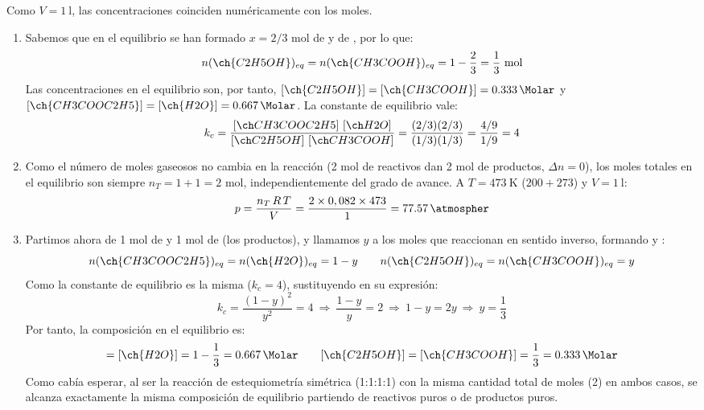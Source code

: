 \begin{exerciseEVAU}
\begin{solu}
        Como \(V = \SI{1}{\litre}\), las concentraciones coinciden numéricamente con los moles.

        \begin{enumerate}[label=\letraminuscula]
\item Sabemos que en el equilibrio se han formado \(x = 2/3\) mol de  y de , por lo que:
\begin{equation*}
    n(\ch{C2H5OH})_{eq} = n(\ch{CH3COOH})_{eq} = 1 - \dfrac{2}{3} = \dfrac{1}{3} \ \text{mol}
\end{equation*}
Las concentraciones en el equilibrio son, por tanto, \([\ch{C2H5OH}] = [\ch{CH3COOH}] = \SI{0.333}{\Molar}\) y \([\ch{CH3COOC2H5}] = [\ch{H2O}] = \SI{0.667}{\Molar}\). La constante de equilibrio vale:
\begin{equation*}
    k_c = \dfrac{\conc{CH3COOC2H5}\ \conc{H2O}}{\conc{C2H5OH}\ \conc{CH3COOH}} = \dfrac{(2/3)(2/3)}{(1/3)(1/3)} = \dfrac{4/9}{1/9} = 4
\end{equation*}
\item Como el número de moles gaseosos no cambia en la reacción (2 mol de reactivos dan 2 mol de productos, \(\Delta n = 0\)), los moles totales en el equilibrio son siempre \(n_T = 1+1 = 2\) mol, independientemente del grado de avance. A \(T = \SI{473}{\kelvin}\) (\(200+273\)) y \(V = \SI{1}{\litre}\):
\begin{equation*}
    p = \dfrac{n_T\, R\, T}{V} = \dfrac{2 \times 0,082 \times 473}{1} = \SI{77.57}{\atmospher}
\end{equation*}
\item Partimos ahora de 1 mol de  y 1 mol de  (los productos), y llamamos \(y\) a los moles que reaccionan en sentido inverso, formando  y :
\begin{equation*}
    n(\ch{CH3COOC2H5})_{eq} = n(\ch{H2O})_{eq} = 1-y \qquad n(\ch{C2H5OH})_{eq} = n(\ch{CH3COOH})_{eq} = y
\end{equation*}
Como la constante de equilibrio es la misma (\(k_c = 4\)), sustituyendo en su expresión:
\begin{equation*}
    k_c = \dfrac{(1-y)^2}{y^2} = 4 \ \Rightarrow \ \dfrac{1-y}{y} = 2 \ \Rightarrow \ 1-y = 2y \ \Rightarrow \ y = \dfrac{1}{3}
\end{equation*}
Por tanto, la composición en el equilibrio es:
\begin{equation*}
    [\ch{CH3COOC2H5}] = [\ch{H2O}] = 1 - \dfrac{1}{3} = \SI{0.667}{\Molar} \qquad [\ch{C2H5OH}] = [\ch{CH3COOH}] = \dfrac{1}{3} = \SI{0.333}{\Molar}
\end{equation*}
Como cabía esperar, al ser la reacción de estequiometría simétrica (1:1:1:1) con la misma cantidad total de moles (2) en ambos casos, se alcanza exactamente la misma composición de equilibrio partiendo de reactivos puros o de productos puros.
        \end{enumerate}

    \end{solu}

\end{exerciseEVAU}

